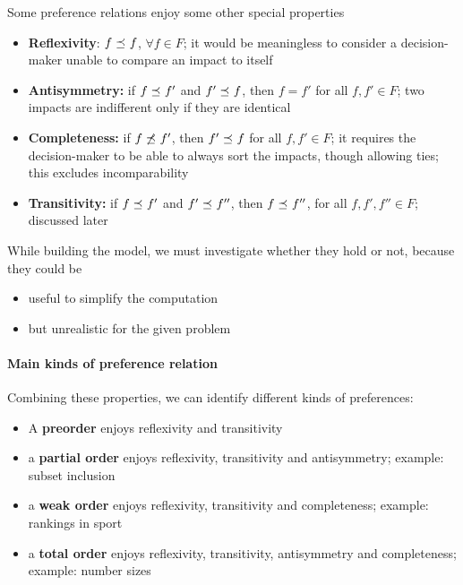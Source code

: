Some preference relations enjoy some other special properties
\begin{itemize}
	\item \textbf{Reflexivity}: $f \preceq_{} f$, $\forall f \in F$; it would be meaningless to consider a decision-maker unable to compare an impact to itself
	
	\item \textbf{Antisymmetry:} if $f \preceq_{} f'$ and $f' \preceq_{} f$, then $f = f'$ for all $f, f' \in F$; two impacts are indifferent only if they are identical
	
	\item \textbf{Completeness:} if $f \not \preceq_{} f'$, then $f' \preceq_{} f$ for all $f, f' \in F$; it requires the decision-maker to be able to always sort the impacts, though allowing ties; this excludes incomparability
	
	\item \textbf{Transitivity:} if $f \preceq_{} f'$ and $f' \preceq_{} f''$, then $f \preceq_{} f''$, for all $f, f', f'' \in F$; discussed later
\end{itemize}

While building the model, we must investigate whether they hold or not, because they could be
\begin{itemize}
	\item useful to simplify the computation
	
	\item but unrealistic for the given problem
\end{itemize}

\paragraph{Main kinds of preference relation} Combining these properties, we can identify different kinds of preferences:
\begin{itemize}
	\item A \textbf{preorder} enjoys reflexivity and transitivity
	
	\item a \textbf{partial order} enjoys reflexivity, transitivity and antisymmetry; example: subset inclusion
	
	\item a \textbf{weak order} enjoys reflexivity, transitivity and completeness; example: rankings in sport
	
	\item a \textbf{total order} enjoys reflexivity, transitivity, antisymmetry and completeness; example: number sizes
\end{itemize}

